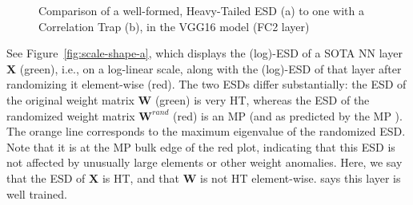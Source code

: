 {\begin{figure}[ht]
    \centering
    \caption{Comparison of a well-formed, Heavy-Tailed ESD (a) to one with a Correlation Trap (b), in the VGG16 model (FC2 layer)}
  \label{fig:scale-shape}                                                                                                      
\end{figure}

See Figure~\ref{fig:scale-shape-a}, which displays the (log)-ESD of a \Typical SOTA NN layer $\mathbf{X}$ (green), i.e., on a log-linear scale, along with the (log)-ESD of that layer after randomizing it element-wise (red).
The two ESDs differ substantially:
the ESD of the original weight matrix $\mathbf{W}$ (green) is very HT, whereas 
the ESD of the randomized weight matrix $\mathbf{W}^{rand}$ (red) is an MP (and as predicted by the MP \RMT).
The orange line corresponds to the maximum eigenvalue of the randomized ESD.
Note that it is at the MP bulk edge of the red plot, indicating that this ESD is not affected by unusually large elements or other weight anomalies.
Here, we say that the ESD of $\mathbf{X}$ is HT, and that $\mathbf{W}$ is not HT element-wise.
\HTSR says this layer is well trained.

}
